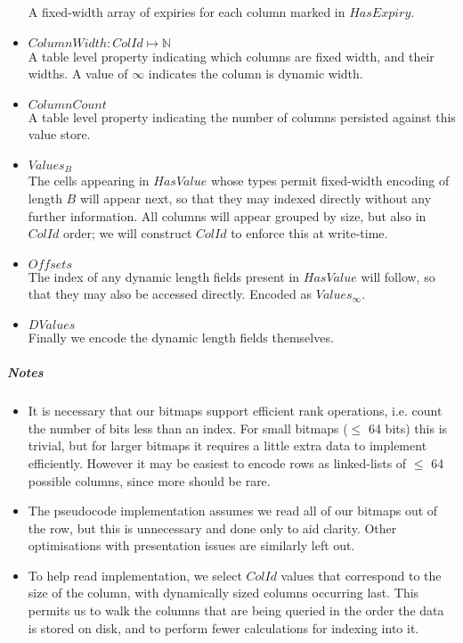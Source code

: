 \documentclass[fleqn]{article}
\begin{document}
\begin{itemize}
    A fixed-width array of expiries for each column marked in $HasExpiry$.
  \item $ColumnWidth : ColId \mapsto \mathbb{N}$\\[2pt]
    A table level property indicating which columns are fixed width, and their widths. A value of $\infty$
    indicates the column is dynamic width.
  \item $ColumnCount$\\[2pt]
    A table level property indicating the number of columns persisted against this value store.
  \item $Values_B$\\[2pt]
    The cells appearing in $HasValue$ whose types permit fixed-width encoding of length $B$ will appear next, 
    so that they may indexed directly without any further information. All columns will appear grouped by
    size, but also in $ColId$ order; we will construct $ColId$ to enforce this at write-time.
  \item $Offsets$\\[2pt]
    The index of any dynamic length fields present in $HasValue$ will follow, so that they may also be 
    accessed directly. Encoded as $Values_{\infty}$.
  \item $DValues$\\[2pt]
    Finally we encode the dynamic length fields themselves.
\end{itemize}

\subparagraph{Notes}
\begin{itemize}
 \item{} It is necessary that our bitmaps support efficient rank operations, i.e. count the number of bits
 less than an index. For small bitmaps ($\leq$ 64 bits) this is trivial, but for larger bitmaps
 it requires a little extra data to implement efficiently. However it may be easiest to encode rows
 as linked-lists of $\leq$ 64 possible columns, since more should be rare.
 \item{} The pseudocode implementation assumes we read all of our bitmaps out of the row, but this is unnecessary
 and done only to aid clarity. Other optimisations with presentation issues are similarly left out.
 \item{} To help read implementation, we select $ColId$ values that correspond to the size of the column, with 
 dynamically sized columns occurring last. This permits us to walk the columns that are being queried in the order
 the data is stored on disk, and to perform fewer calculations for indexing into it. 
\end{itemize}
\end{document}
